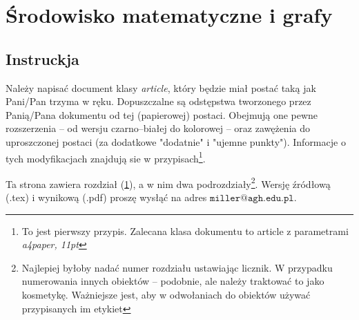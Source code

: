 \documentclass[a4paper, 11pt]{article}
\begin{document}
\section{Środowisko matematyczne i grafy}
\label{title}

\subsection{Instruckja}
Należy napisać document klasy {\em article}, który będzie miał postać taką jak Pani/Pan trzyma w ręku. Dopuszczalne są odstępstwa tworzonego przez Panią/Pana dokumentu od tej (papierowej) postaci. Obejmują one pewne rozszerzenia -- od wersju czarno--białej do kolorowej -- oraz zawężenia do uproszczonej postaci (za dodatkowe "dodatnie" i "ujemne punkty"). Informacje o tych modyfikacjach znajdują sie w przypisach\footnote{To jest pierwszy przypis. Zalecana klasa dokumentu to article z parametrami {\em a4paper, 11pt}}.

Ta strona zawiera rozdział (\ref{title}), a w nim dwa podrozdziały\footnote{Najlepiej byłoby nadać numer rozdziału ustawiając licznik. W przypadku numerowania innych obiektów -- podobnie, ale należy traktować to jako kosmetykę. Ważniejsze jest, aby w odwołaniach do obiektów używać przypisanych im etykiet}. Wersję źródłową (.tex) i wynikową (.pdf) proszę wysłąć na adres $\mathtt{miller@agh.edu.pl}$.
\end{document}
